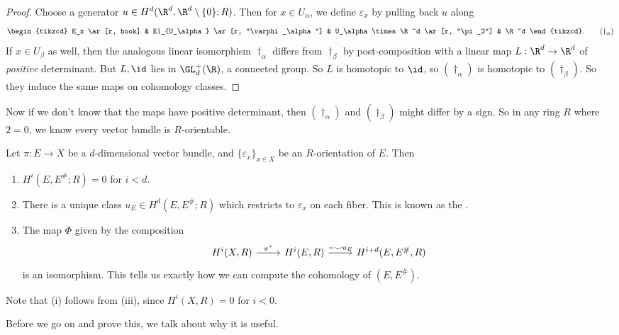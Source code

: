 \documentclass[a4paper]{article}
\begin{document}
\begin{proof}
  Choose a generator $u \in H^d(\R^d, \R^d \setminus \{0\}; R)$. Then for $x \in U_\alpha$, we define $\varepsilon_x$ by pulling back $u$ along
  \[
    \begin{tikzcd}
      E_x \ar[r, hook] & E|_{U_\alpha} \ar[r, "\varphi_\alpha"] & U_\alpha \times \R^d \ar[r, "\pi_2"] & \R^d
    \end{tikzcd}.\tag{$\dagger_\alpha$}
  \]
  If $x \in U_\beta$ as well, then the analogous linear isomorphism $\dagger_\alpha$ differs from $\dagger_\beta$ by post-composition with a linear map $L: \R^d \to \R^d$ of \emph{positive} determinant. But $L, \id$ lies in $\GL_d^+(\R)$, a connected group. So $L$ is homotopic to $\id$, so $(\dagger_\alpha)$ is homotopic to $(\dagger_\beta)$. So they induce the same maps on cohomology classes.
\end{proof}
Now if we don't know that the maps have positive determinant, then $(\dagger_\alpha)$ and $(\dagger_\beta)$ might differ by a sign. So in any ring $R$ where $2 = 0$, we know every vector bundle is $R$-orientable.

\begin{thm}
  Let $\pi: E \to X$ be a $d$-dimensional vector bundle, and $\{\varepsilon_x\}_{x \in X}$ be an $R$-orientation of $E$. Then
  \begin{enumerate}
    \item $H^i(E, E^\#; R) = 0$ for $i < d$.
    \item There is a unique class $u_E \in H^d(E, E^\#; R)$ which restricts to $\varepsilon_x$ on each fiber. This is known as the .
    \item The map $\Phi$ given by the composition
      \[
        \begin{tikzcd}
          H^i(X, R) \ar[r, "\pi^*"] & H^i(E, R) \ar[r, "-\smile u_E"] & H^{i + d}(E, E^\#, R)
        \end{tikzcd}
      \]
      is an isomorphism. This tells us exactly how we can compute the cohomology of $(E, E^\#)$.
  \end{enumerate}
\end{thm}
Note that (i) follows from (iii), since $H^i(X, R) = 0$ for $i < 0$.

Before we go on and prove this, we talk about why it is useful.
\end{document}
